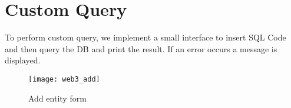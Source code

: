 \section{Custom Query}

To perform custom query, we implement a small interface to insert SQL Code and then query the DB and print the result.
If an error occurs a message is displayed.

\begin{figure}[!ht]
	\centering
	\texttt{[image: web3\_add]}
	\caption{Add entity form\label{fig:ddl-scheme}}
\end{figure}



